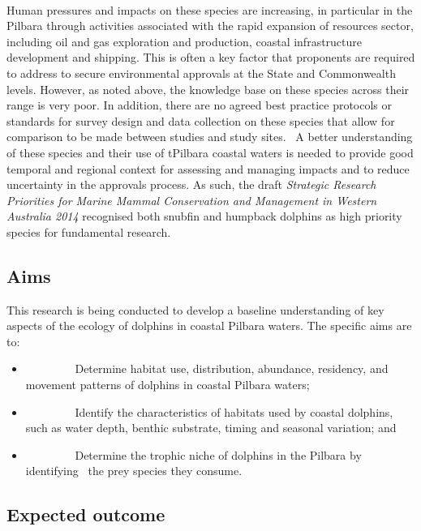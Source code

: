 \documentclass[version=last,
    paper=a4,                               %
    10pt,                                   %
    dvipsnames,
    oneside,                              %
    headings=openany,                       %
    open=any,
    BCOR=7mm,                               %
    DIV=15,     %
]{scrbook}
\providecommand{\tightlist}{\setlength{\itemsep}{0pt}\setlength{\parskip}{0pt}}
\begin{document}
~

Human pressures and impacts on these species are increasing, in
particular in the Pilbara through activities associated with the rapid
expansion of resources sector, including oil and gas exploration and
production, coastal infrastructure development and shipping. This is
often a key factor that proponents are required to address to secure
environmental approvals at the State and Commonwealth levels. However,
as noted above, the knowledge base on these species across their range
is very poor. In addition, there are no agreed best practice protocols
or standards for survey design and data collection on these species that
allow for comparison to be made between studies and study sites. ~A
better understanding of these species and their use of tPilbara coastal
waters is needed to provide good temporal and regional context for
assessing and managing impacts and to reduce uncertainty in the
approvals process. As such, the draft \emph{Strategic Research
Priorities for Marine Mammal Conservation and Management in Western
Australia 2014} recognised both snubfin and humpback dolphins as high
priority species for fundamental research.




\subsection*{Aims}

This research is being conducted to develop a baseline understanding of
key aspects of the ecology of dolphins in coastal Pilbara waters. The
specific aims are to:

\begin{itemize}
\tightlist
\item
  ~~~~~~~~ Determine habitat use, distribution, abundance, residency,
  and movement patterns of dolphins in coastal Pilbara waters;
\item
  ~~~~~~~~ Identify the characteristics of habitats used by coastal
  dolphins, such as water depth, benthic substrate, timing and seasonal
  variation; and
\item
  ~~~~~~~~ Determine the trophic niche of dolphins in the Pilbara by
  identifying ~the prey species they consume.
\end{itemize}




\subsection*{Expected outcome}
\end{document}
